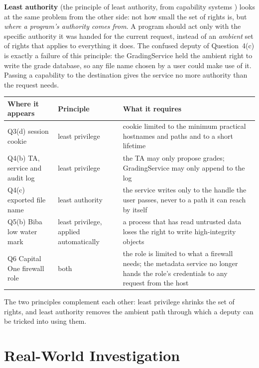 \documentclass[11pt,a4paper]{article}
\begin{document}
\textbf{Least authority} (the principle of least authority, from capability systems \cite{hardy}) looks at the same
problem from the other side: not how small the set of rights is, but \emph{where a program's authority comes from}.
A program should act only with the specific authority it was handed for the current request, instead of an
\emph{ambient} set of rights that applies to everything it does. The confused deputy of Question~4(c) is exactly a
failure of this principle: the GradingService held the ambient right to write the grade database, so any file name
chosen by a user could make use of it. Passing a capability to the destination gives the service no more authority
than the request needs.

\begin{table}[H]
\centering\small
\begin{tabularx}{\textwidth}{@{}P{3.9cm}P{2.6cm}L@{}}
\toprule
Where it appears & Principle & What it requires \\
\midrule
Q3(d) session cookie & least privilege & cookie limited to the minimum practical hostnames and paths and to a short lifetime \cite{nist63b4} \\
Q4(b) TA, service and audit log & least privilege & the TA may only propose grades; GradingService may only append to the log \\
Q4(c) exported file name & least authority & the service writes only to the handle the user passes, never to a path it can reach by itself \\
Q5(b) Biba low water mark & least privilege, applied automatically & a process that has read untrusted data loses the right to write high-integrity objects \\
Q6 Capital One firewall role & both & the role is limited to what a firewall needs; the metadata service no longer hands the role's credentials to any request from the host \\
\bottomrule
\end{tabularx}
\end{table}
The two principles complement each other: least privilege shrinks the set of rights, and least authority removes the
ambient path through which a deputy can be tricked into using them.

\section*{Real-World Investigation}
\end{document}
